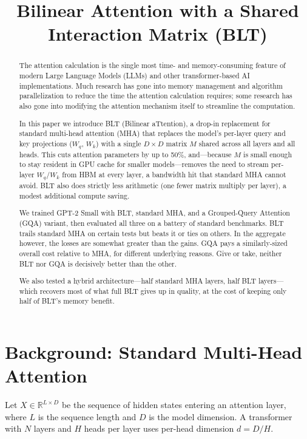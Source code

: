 \documentclass[11pt]{article}
\title{Bilinear Attention with a Shared Interaction Matrix (BLT)}
\author{}
\date{}
\begin{document}
\maketitle

\begin{abstract}
The attention calculation is the single most time- and memory-consuming feature of modern Large Language Models (LLMs) and other transformer-based AI implementations. Much research has gone into memory management and algorithm parallelization to reduce the time the attention calculation requires; some research has also gone into modifying the attention mechanism itself to streamline the computation.

In this paper we introduce BLT (Bilinear aTtention), a drop-in replacement for standard multi-head attention (MHA) that replaces the model's per-layer query and key projections ($W_q$, $W_k$) with a single $D\times D$ matrix $M$ shared across all layers and all heads. This cuts attention parameters by up to 50\%, and---because $M$ is small enough to stay resident in GPU cache for smaller models---removes the need to stream per-layer $W_q$/$W_k$ from HBM at every layer, a bandwidth hit that standard MHA cannot avoid. BLT also does strictly less arithmetic (one fewer matrix multiply per layer), a modest additional compute saving.

We trained GPT-2 Small with BLT, standard MHA, and a Grouped-Query Attention (GQA) variant, then evaluated all three on a battery of standard benchmarks. BLT trails standard MHA on certain tests but beats it or ties on others. In the aggregate however, the losses are somewhat greater than the gains. GQA pays a similarly-sized overall cost relative to MHA, for different underlying reasons. Give or take, neither BLT nor GQA is decisively better than the other.

We also tested a hybrid architecture---half standard MHA layers, half BLT layers---which recovers most of what full BLT gives up in quality, at the cost of keeping only half of BLT's memory benefit.
\end{abstract}

\section{Background: Standard Multi-Head Attention}

Let $X \in \mathbb{R}^{L\times D}$ be the sequence of hidden states entering an attention layer, where $L$ is the sequence length and $D$ is the model dimension. A transformer with $N$ layers and $H$ heads per layer uses per-head dimension $d = D/H$.
\end{document}
